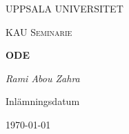 \begin{titlepage}

  \centering
	{\scshape\LARGE UPPSALA UNIVERSITET\par}
	\vspace{1cm}
  {\scshape\Large {KAU Seminarie} \par}
	\vspace{1.5cm}
  {\huge\bfseries {ODE} \par}
	\vspace{2cm}
	{\Large\itshape Rami Abou Zahra \par}
	\vfill
  \vfill


  {\large Inlämningsdatum}\par
  {\today}

\end{titlepage}
